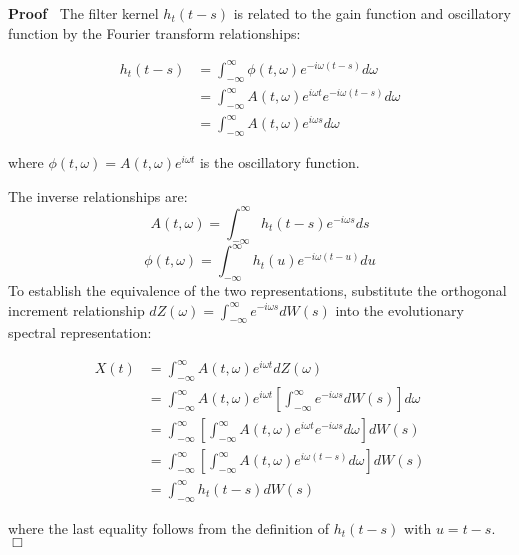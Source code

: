 \documentclass{article}
\newenvironment{proof}{\noindent\textbf{Proof\ }}{\hspace*{\fill}$\Box$\medskip}
\begin{document}
\begin{proof}
  The filter kernel $h_t  (t - s)$ is related to the gain function and
  oscillatory function by the Fourier transform relationships:
  
  \begin{align}
    h_t  (t - s) & = \int_{- \infty}^{\infty} \phi (t, \omega) e^{- i \omega
    (t - s)} d \omega \\
    & = \int_{- \infty}^{\infty} A (t, \omega) e^{i \omega t} e^{- i \omega
    (t - s)} d \omega \\
    & = \int_{- \infty}^{\infty} A (t, \omega) e^{i \omega s} d \omega 
  \end{align}
  
  where $\phi (t, \omega) = A (t, \omega) e^{i \omega t}$ is the oscillatory
  function.
  
  The inverse relationships are:
  \begin{equation}
    A (t, \omega) = \int_{- \infty}^{\infty} h_t  (t - s) e^{- i \omega s} ds
  \end{equation}
  \begin{equation}
    \phi (t, \omega) = \int_{- \infty}^{\infty} h_t (u) e^{- i \omega (t - u)}
    du
  \end{equation}
  To establish the equivalence of the two representations, substitute the
  orthogonal increment relationship $dZ (\omega) = \int_{- \infty}^{\infty}
  e^{- i \omega s} dW (s)$ into the evolutionary spectral representation:
  
  \begin{align}
    X (t) & = \int_{- \infty}^{\infty} A (t, \omega) e^{i \omega t} dZ
    (\omega) \\
    & = \int_{- \infty}^{\infty} A (t, \omega) e^{i \omega t} \left[ \int_{-
    \infty}^{\infty} e^{- i \omega s} dW (s) \right] d \omega \\
    & = \int_{- \infty}^{\infty} \left[ \int_{- \infty}^{\infty} A (t,
    \omega) e^{i \omega t} e^{- i \omega s} d \omega \right] dW (s) \\
    & = \int_{- \infty}^{\infty} \left[ \int_{- \infty}^{\infty} A (t,
    \omega) e^{i \omega (t - s)} d \omega \right] dW (s) \\
    & = \int_{- \infty}^{\infty} h_t  (t - s) dW (s) 
  \end{align}
  
  where the last equality follows from the definition of $h_t  (t - s)$ with
  $u = t - s$.
\end{proof}
\end{document}
